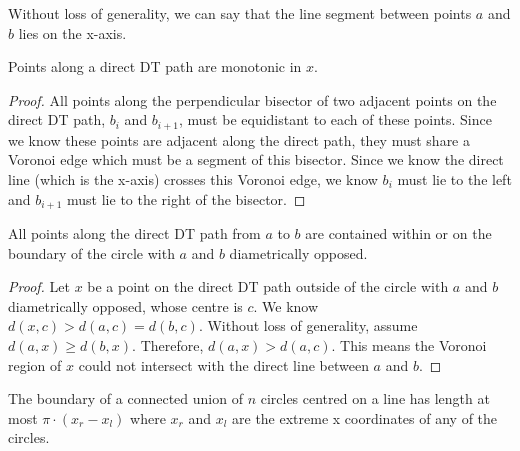 \documentclass{tufte-handout}
\begin{document}
Without loss of generality, we can say that the line segment between
points $a$ and $b$ lies on the x-axis.

\newpage

\begin{Lemma}

  \label{lemma:monotonic:path}

  Points along a direct DT path are monotonic in $x$.

\end{Lemma}

\begin{proof}

  All points along the perpendicular bisector of two adjacent points
  on the direct DT path, $b_i$ and $b_{i+1}$, must be equidistant to
  each of these points.  Since we know these points are adjacent along
  the direct path, they must share a Voronoi edge which must be a
  segment of this bisector.  Since we know the direct line (which is
  the x-axis) crosses this Voronoi edge, we know $b_i$ must lie to the
  left and $b_{i+1}$ must lie to the right of the bisector.
  
\end{proof}

\begin{Lemma}

  \label{lemma:circle:contains:path}

  All points along the direct DT path from $a$ to $b$ are contained
  within or on the boundary of the circle with $a$ and $b$
  diametrically opposed.  \footnotemark
  
\end{Lemma}

  
\begin{proof}
  
  Let $x$ be a point on the direct DT path outside of the circle
  with $a$ and $b$ diametrically opposed, whose centre is $c$.  We
  know $d(x,c) > d(a,c) = d(b,c)$.  Without loss of generality,
  assume $d(a,x) \ge d(b,x)$.  Therefore, $d(a,x) > d(a,c)$.  This
  means the Voronoi region of $x$ could not intersect with the
  direct line between $a$ and $b$.
  
\end{proof}

\newpage

\begin{Lemma}

  \label{lemma:boundary:circles}

  The boundary of a connected union of $n$ circles centred on a line
  has length at most $\pi \cdot ( x_r - x_l )$ where $x_r$ and $x_l$
  are the extreme x coordinates of any of the circles.
  
\end{Lemma}
\end{document}
